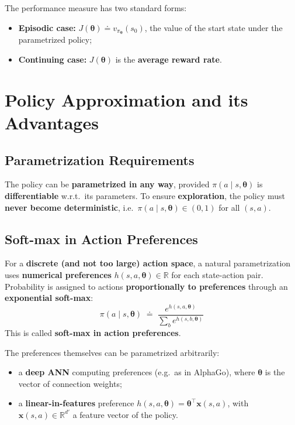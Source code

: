 \documentclass[11pt,a4paper]{article}
\theoremstyle{definition}
\theoremstyle{plain}
\theoremstyle{remark}
\begin{document}
The performance measure has two standard forms:
\begin{itemize}
    \item \textbf{Episodic case:} $J(\boldsymbol{\theta}) \doteq v_{\pi_{\boldsymbol{\theta}}}(s_0)$, the value of the start state under the parametrized policy;
    \item \textbf{Continuing case:} $J(\boldsymbol{\theta})$ is the \textbf{average reward rate}.
\end{itemize}

\section{Policy Approximation and its Advantages}

\subsection{Parametrization Requirements}

The policy can be \textbf{parametrized in any way}, provided $\pi(a \mid s, \boldsymbol{\theta})$ is \textbf{differentiable} w.r.t.\ its parameters. To ensure \textbf{exploration}, the policy must \textbf{never become deterministic}, i.e.\ $\pi(a \mid s, \boldsymbol{\theta}) \in (0, 1)$ for all $(s, a)$.

\subsection{Soft-max in Action Preferences}

For a \textbf{discrete (and not too large) action space}, a natural parametrization uses \textbf{numerical preferences} $h(s, a, \boldsymbol{\theta}) \in \mathbb{R}$ for each state-action pair. Probability is assigned to actions \textbf{proportionally to preferences} through an \textbf{exponential soft-max}:
\[
    \boxed{\;\pi(a \mid s, \boldsymbol{\theta}) \;\doteq\; \frac{e^{h(s, a, \boldsymbol{\theta})}}{\sum_b e^{h(s, b, \boldsymbol{\theta})}}\;}
\]
This is called \textbf{soft-max in action preferences}.

The preferences themselves can be parametrized arbitrarily:
\begin{itemize}
    \item a \textbf{deep ANN} computing preferences (e.g.\ as in AlphaGo), where $\boldsymbol{\theta}$ is the vector of connection weights;
    \item a \textbf{linear-in-features} preference $h(s, a, \boldsymbol{\theta}) = \boldsymbol{\theta}^\top \mathbf{x}(s, a)$, with $\mathbf{x}(s, a) \in \mathbb{R}^{d'}$ a feature vector of the policy.
\end{itemize}
\end{document}
